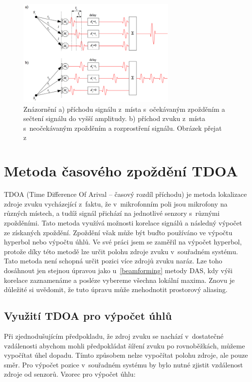 \begin{figure}[hbt]
	\centering
	\includegraphics[width=0.7\textwidth]{obrazky-figures/DAS.png}
	\caption{Znázornění a) příchodu signálu z~místa s~očekávaným zpožděním a sečtení signálu do vyšší amplitudy. b) příchod zvuku z~místa s~neočekávaným zpožděním a rozprostření signálu. Obrázek přejat z~\cite{dasobrazek}}
	\label{pic:DAS}
\end{figure}
\newpage
\section{Metoda časového zpoždění TDOA}

TDOA (Time Difference Of Arival – časový rozdíl příchodu) je metoda lokalizace zdroje zvuku vycházející z~faktu, že v~mikrofonním poli jsou mikrofony na různých místech, a tudíž signál přichází na jednotlivé senzory s~různými zpožděními. Tato metoda využívá možnosti korelace signálů a následný výpočet ze získaných zpoždění. Zpoždění však může být buďto používáno ve výpočtu hyperbol nebo výpočtu úhlů. Ve své práci jsem se zaměřil na výpočet hyperbol, protože díky této metodě lze určit polohu zdroje zvuku v~souřadném systému. Tato metoda není schopná určit pozici více zdrojů zvuku naráz. Lze toho dosáhnout jen stejnou úpravou jako u~\ref{beamforming} metody DAS, kdy výši korelace zaznamenáme a posléze vybereme všechna lokální maxima. Znovu je důležité si uvědomit, že tuto úpravu může znehodnotit prostorový aliasing.

\subsection{Využití TDOA pro výpočet úhlů}

Při zjednodušujícím předpokladu, že zdroj zvuku se nachází v~dostatečné vzdálenosti abychom mohli předpokládat šíření zvuku po rovnoběžkách, můžeme vypočítat úhel dopadu. Tímto způsobem nelze vypočítat polohu zdroje, ale pouze směr. Pro výpočet pozice v~souřadném systému by bylo nutné zjistit vzdálenost zdroje od senzorů. Vzorec pro výpočet úhlu:

